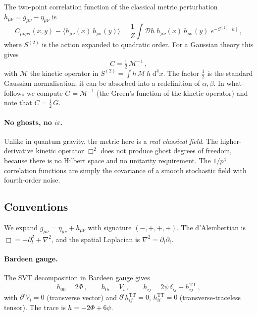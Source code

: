 \documentclass[11pt,a4paper]{article}
\newcommand{\dd}{\mathrm{d}}
\newcommand{\TT}{\mathrm{TT}}
\theoremstyle{definition}
\theoremstyle{remark}
\begin{document}
The two-point correlation function of the classical metric perturbation
$h_{\mu\nu} = g_{\mu\nu} - \eta_{\mu\nu}$ is
\begin{equation}\label{eq:corr-def}
  C_{\mu\nu\rho\sigma}(x,y)
  \equiv \langle h_{\mu\nu}(x)\, h_{\rho\sigma}(y)\rangle
  = \frac{1}{Z}\int\!\mathcal{D}h\; h_{\mu\nu}(x)\,h_{\rho\sigma}(y)\;
    e^{-S^{(2)}[h]}\,,
\end{equation}
where $S^{(2)}$ is the action expanded to quadratic order.
For a Gaussian theory this gives
\begin{equation}\label{eq:gauss}
  C = \tfrac{1}{2}\,\mathcal{M}^{-1}\,,
\end{equation}
with $\mathcal{M}$ the kinetic operator in
$S^{(2)} = \int h\,\mathcal{M}\, h\;\dd^4x$.
The factor $\frac{1}{2}$ is the standard Gaussian normalisation;
it can be absorbed into a redefinition of $\alpha,\beta$.
In what follows we compute $G = \mathcal{M}^{-1}$ (the Green's function
of the kinetic operator) and note that
$C = \tfrac{1}{2}\,G$.

\paragraph{No ghosts, no $i\varepsilon$.}
Unlike in quantum gravity, the metric here is a \emph{real classical
field}.  The higher-derivative kinetic operator $\Box^2$ does not
produce ghost degrees of freedom, because there is no Hilbert space
and no unitarity requirement.  The $1/p^4$ correlation functions
are simply the covariance of a smooth stochastic field with
fourth-order noise.

\subsection{Conventions}

We expand $g_{\mu\nu} = \eta_{\mu\nu} + h_{\mu\nu}$ with signature
$(-,+,+,+)$.  The d'Alembertian is
$\Box = -\partial_t^2 + \nabla^2$, and the spatial Laplacian is
$\nabla^2 = \partial_i\partial_i$.

\paragraph{Bardeen gauge.}
The SVT decomposition in Bardeen gauge gives
\begin{equation}\label{eq:svt}
  h_{00} = 2\Phi\,,\qquad
  h_{0i} = V_i\,,\qquad
  h_{ij} = 2\psi\,\delta_{ij} + h^\TT_{ij}\,,
\end{equation}
with $\partial^i V_i = 0$ (transverse vector) and
$\partial^i h^\TT_{ij} = 0$, $h^\TT_{ii} = 0$
(transverse-traceless tensor).
The trace is $h = -2\Phi + 6\psi$.
\end{document}

